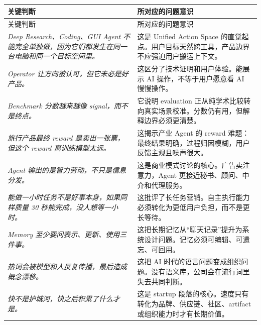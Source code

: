 \documentclass[a4paper]{article}
\begin{document}
\begin{longtable}{>{\raggedright\arraybackslash}p{} >{\raggedright\arraybackslash}p{}}
\toprule
关键判断 & 所对应的问题意识 \\
\midrule
\endfirsthead
\toprule
关键判断 & 所对应的问题意识 \\
\midrule
\endhead
\textit{Deep Research、Coding、GUI Agent 不能完全单独做，因为它们都发生在同一台电脑和同一个目标空间里。} & 这是 Unified Action Space 的直觉起点。用户目标天然跨工具，产品边界不应强迫用户搬运上下文。 \\
\textit{Operator 让方向被认可，但它未必是好产品。} & 这区分了技术证明和用户体验。能展示 AI 操作，不等于用户愿意看 AI 慢慢操作。 \\
\textit{Benchmark 分数越来越像 signal，而不是终点。} & 它说明 evaluation 正从纯学术比较转向真实场景校准。分数仍有用，但解释边界必须更清楚。 \\
\textit{旅行产品最终 reward 是卖出一张票，但这个 reward 离训练模型太远。} & 这揭示产业 Agent 的 reward 难题：最终结果明确，过程归因模糊，用户反馈主观且噪声很大。 \\
\textit{Agent 输出的是智力劳动，不只是信息分发。} & 这是商业模式讨论的核心。广告卖注意力，Agent 更接近秘书、顾问、中介和代理服务。 \\
\textit{能做一小时任务不是好事本身，如果同样质量 30 秒能完成，没人想等一小时。} & 这批评了长任务营销。自主执行能力必须转化为更低用户负担，而不是更长等待。 \\
\textit{Memory 至少要问表示、更新、使用三件事。} & 这把长期记忆从“聊天记录”提升为系统设计问题。记忆必须可编辑、可遗忘、可回用。 \\
\textit{热词会被模型和人反复传播，最后造成概念漂移。} & 这把 AI 时代的语言问题变成组织问题。没有语义库，公司会在流行词里失去共同判断。 \\
\textit{快不是护城河，快之后积累了什么才是。} & 这是 startup 段落的核心。速度只有转化为品牌、供应链、社区、artifact 或组织能力时才有长期价值。 \\
\bottomrule
\end{longtable}
\end{document}
